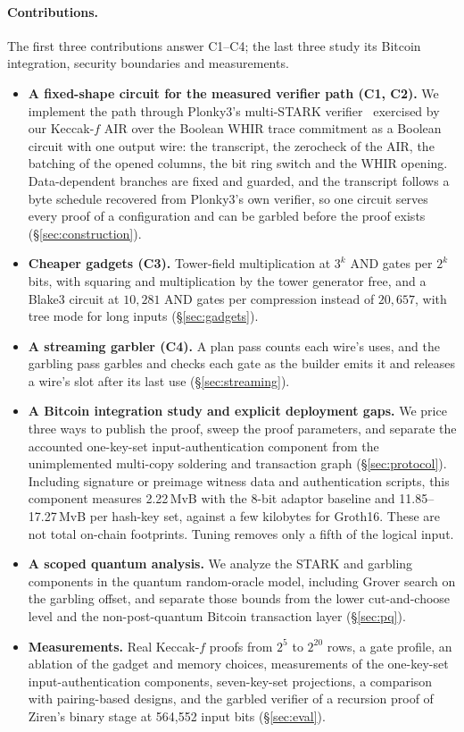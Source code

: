 \documentclass[11pt]{article}
\newcommand{\AND}{\textsf{AND}}
\begin{document}
\paragraph{Contributions.} The first three contributions answer C1--C4; the
last three study its Bitcoin integration, security boundaries and measurements.
\begin{itemize}
  \item \textbf{A fixed-shape circuit for the measured verifier path (C1, C2).}
    We implement the path through Plonky3's multi-STARK
    verifier~\cite{plonky3} exercised by our Keccak-$f$ AIR over the Boolean WHIR
    trace commitment as a Boolean circuit with one output wire: the transcript,
    the zerocheck of the AIR, the batching of the opened columns, the bit ring
    switch and the WHIR opening. Data-dependent branches are fixed and guarded,
    and the transcript follows a byte schedule recovered from Plonky3's own
    verifier, so one circuit serves every proof of a configuration and can be
    garbled before the proof exists (\S\ref{sec:construction}).
  \item \textbf{Cheaper gadgets (C3).} Tower-field multiplication at $3^k$ \AND{}
    gates per $2^k$ bits, with squaring and multiplication by the tower generator
    free, and a Blake3 circuit at $10{,}281$ \AND{} gates per compression instead
    of $20{,}657$, with tree mode for long inputs (\S\ref{sec:gadgets}).
  \item \textbf{A streaming garbler (C4).} A plan pass counts each wire's uses,
    and the garbling pass garbles and checks each gate as the builder emits it and
    releases a wire's slot after its last use (\S\ref{sec:streaming}).
  \item \textbf{A Bitcoin integration study and explicit deployment gaps.} We
    price three ways to publish the proof, sweep the proof parameters, and
    separate the accounted one-key-set input-authentication component from the
    unimplemented multi-copy soldering and transaction graph
    (\S\ref{sec:protocol}). Including signature or preimage witness data and
    authentication scripts, this component measures 2.22\,MvB with the 8-bit
    adaptor baseline and 11.85--17.27\,MvB per hash-key set, against a few kilobytes
    for Groth16. These are not total on-chain footprints. Tuning removes only a
    fifth of the logical input.
  \item \textbf{A scoped quantum analysis.} We analyze the STARK and garbling
    components in the quantum random-oracle model, including Grover search on
    the garbling offset, and separate those bounds from the lower
    cut-and-choose level and the non-post-quantum Bitcoin transaction layer
    (\S\ref{sec:pq}).
  \item \textbf{Measurements.} Real Keccak-$f$ proofs from $2^5$ to $2^{20}$ rows,
    a gate profile, an ablation of the gadget and memory choices, measurements
    of the one-key-set input-authentication components, seven-key-set
    projections, a comparison with pairing-based designs, and the garbled
    verifier of a recursion proof of Ziren's binary stage at 564{,}552 input
    bits (\S\ref{sec:eval}).
\end{itemize}
\end{document}
